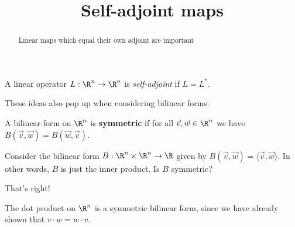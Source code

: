 \documentclass{ximera}
\title{Self-adjoint maps}
\begin{document}
\begin{abstract}
  Linear maps which equal their own adjoint are important
\end{abstract}

\begin{definition}
  A linear operator $L:\R^n \to \R^n$ is \textit{self-adjoint} if $L = L^*$.
\end{definition}

These ideas also pop up when considering bilinear forms.
\begin{definition}
  A bilinear form on $\R^n$ is \textbf{symmetric} if for all $\vec{v},\vec{w} \in \R^n$ we have $B(\vec{v},\vec{w}) = B(\vec{w},\vec{v})$.
\end{definition}

\begin{question}
  Consider the bilinear form $B : \R^n \times \R^n \to \R$ given by $B(\vec{v},\vec{w}) = \langle \vec{v}, \vec{w} \rangle$.   In other words, $B$ is just the inner product.  Is $B$ symmetric?
  \begin{solution}
    \begin{multiple-choice}
    \end{multiple-choice}
  \end{solution}
  
  That's right!

  \begin{example}
    The dot product on $\R^n$ is a symmetric bilinear form, since we have already shown that $v \cdot w = w \cdot v$.
  \end{example}


\end{question}
\end{document}
